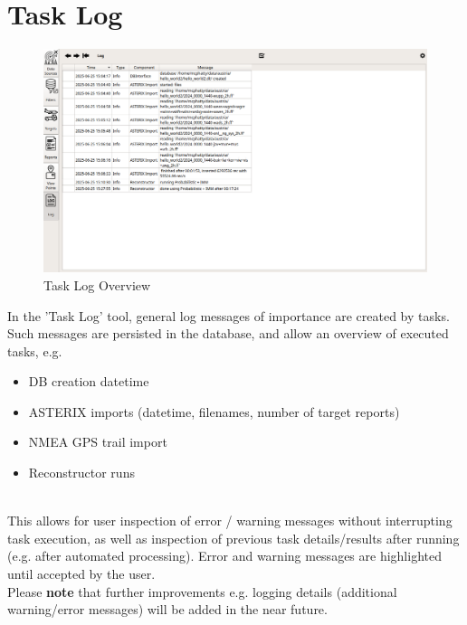 \section{Task Log}
\label{sec:task_log}

\begin{figure}[H]
    \hspace*{-2.5cm}
    \includegraphics[width=19cm,frame]{figures/task_log.png}
  \caption{Task Log Overview}
\end{figure}

In the 'Task Log' tool, general log messages of importance are created by tasks. Such messages are persisted in the database, and allow an overview of executed tasks, e.g.

\begin{itemize}
  \item DB creation datetime
  \item ASTERIX imports (datetime, filenames, number of target reports)
  \item NMEA GPS trail import
  \item Reconstructor runs
\end{itemize} 
\  \\

This allows for user inspection of error / warning messages without interrupting task execution, as well as inspection of previous task details/results after running (e.g. after automated processing). Error and warning messages are highlighted until accepted by the user.
\\

Please \textbf{note} that further improvements e.g. logging details (additional warning/error messages) will be added in the near future.
